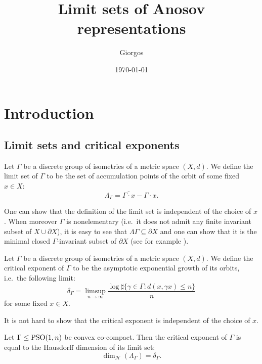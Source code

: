 \documentclass{report}
\title{Limit sets of Anosov representations}
\author{Giorgos}
\date{\today}
\begin{document}
\maketitle

\tableofcontents

\chapter{Introduction}
\section{Limit sets and critical exponents}
\begin{definition}
    Let $\Gamma$ be a discrete group of isometries of a metric space $(X,d)$.
    We define the limit set of $\Gamma$ to be the set of accumulation points of the orbit of some fixed $x \in X$:
    \[
    \Lambda_\Gamma = \overline{\Gamma \cdot x} - \Gamma \cdot x.
    \]
\end{definition}
\begin{remark}
    One can show that the definition of the limit set is independent of the choice of $x$.
    When moreover $\Gamma$ is nonelementary (i.e.\ it does not admit any finite invariant subset of $X \cup \partial X$), it is easy to see that $\Lambda \Gamma \subseteq \partial X$ and one can show that it is the minimal closed $\Gamma$-invariant subset of $\partial X$ (see for example \cite[Proposition 4.7]{quint2006overview}).
\end{remark}
\begin{definition}
    Let $\Gamma$ be a discrete group of isometries of a metric space $(X,d)$.
    We define the critical exponent of $\Gamma$ to be the asymptotic exponential growth of its orbits, i.e.\ the following limit:
    \[
    \delta_\Gamma = \limsup_{n\to \infty} \frac{\log \sharp \{ \gamma \in \Gamma : d(x, \gamma x) \leq n \}}{n}
    \]
    for some fixed $x \in X$.
\end{definition}
\begin{remark}
    It is not hard to show that the critical exponent is independent of the choice of $x$.    
\end{remark}

\begin{theorem}
    Let $\Gamma \leq \operatorname{{\mathrm{PSO}}}(1,n)$ be convex co-compact.
    Then the critical exponent of $\Gamma$ is equal to the Hausdorff dimension of its limit set:
    \[
    \dim_{\mathcal H}(\Lambda_\Gamma) = \delta_\Gamma.
    \]
\end{theorem}
\end{document}

